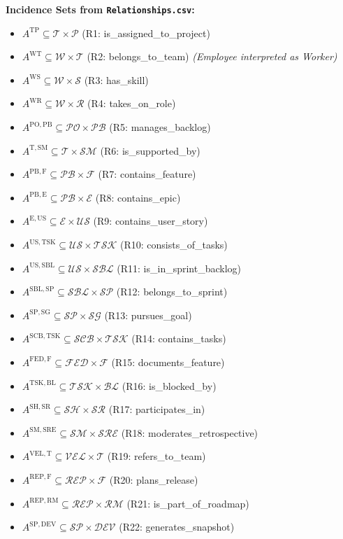 \documentclass[11pt,a4paper]{article}
\begin{document}
\medskip
\noindent\textbf{Incidence Sets from \texttt{Relationships.csv}:}
\begin{itemize}[leftmargin=2em]
  \item \(A^{\mathrm{TP}}\subseteq \mathcal{T}\times\mathcal{P}\) (R1: is\_assigned\_to\_project)
  \item \(A^{\mathrm{WT}}\subseteq \mathcal{W}\times\mathcal{T}\) (R2: belongs\_to\_team) \emph{(Employee interpreted as Worker)}
  \item \(A^{\mathrm{WS}}\subseteq \mathcal{W}\times\mathcal{S}\) (R3: has\_skill)
  \item \(A^{\mathrm{WR}}\subseteq \mathcal{W}\times\mathcal{R}\) (R4: takes\_on\_role)
  \item \(A^{\mathrm{PO,PB}}\subseteq \mathcal{PO}\times\mathcal{PB}\) (R5: manages\_backlog)
  \item \(A^{\mathrm{T,SM}}\subseteq \mathcal{T}\times\mathcal{SM}\) (R6: is\_supported\_by)
  \item \(A^{\mathrm{PB,F}}\subseteq \mathcal{PB}\times\mathcal{F}\) (R7: contains\_feature)
  \item \(A^{\mathrm{PB,E}}\subseteq \mathcal{PB}\times\mathcal{E}\) (R8: contains\_epic)
  \item \(A^{\mathrm{E,US}}\subseteq \mathcal{E}\times\mathcal{US}\) (R9: contains\_user\_story)
  \item \(A^{\mathrm{US,TSK}}\subseteq \mathcal{US}\times\mathcal{TSK}\) (R10: consists\_of\_tasks)
  \item \(A^{\mathrm{US,SBL}}\subseteq \mathcal{US}\times\mathcal{SBL}\) (R11: is\_in\_sprint\_backlog)
  \item \(A^{\mathrm{SBL,SP}}\subseteq \mathcal{SBL}\times\mathcal{SP}\) (R12: belongs\_to\_sprint)
  \item \(A^{\mathrm{SP,SG}}\subseteq \mathcal{SP}\times\mathcal{SG}\) (R13: pursues\_goal)
  \item \(A^{\mathrm{SCB,TSK}}\subseteq \mathcal{SCB}\times\mathcal{TSK}\) (R14: contains\_tasks)
  \item \(A^{\mathrm{FED,F}}\subseteq \mathcal{FED}\times\mathcal{F}\) (R15: documents\_feature)
  \item \(A^{\mathrm{TSK,BL}}\subseteq \mathcal{TSK}\times\mathcal{BL}\) (R16: is\_blocked\_by)
  \item \(A^{\mathrm{SH,SR}}\subseteq \mathcal{SH}\times\mathcal{SR}\) (R17: participates\_in)
  \item \(A^{\mathrm{SM,SRE}}\subseteq \mathcal{SM}\times\mathcal{SRE}\) (R18: moderates\_retrospective)
  \item \(A^{\mathrm{VEL,T}}\subseteq \mathcal{VEL}\times\mathcal{T}\) (R19: refers\_to\_team)
  \item \(A^{\mathrm{REP,F}}\subseteq \mathcal{REP}\times\mathcal{F}\) (R20: plans\_release)
  \item \(A^{\mathrm{REP,RM}}\subseteq \mathcal{REP}\times\mathcal{RM}\) (R21: is\_part\_of\_roadmap)
  \item \(A^{\mathrm{SP,DEV}}\subseteq \mathcal{SP}\times\mathcal{DEV}\) (R22: generates\_snapshot)
\end{itemize}
\end{document}

